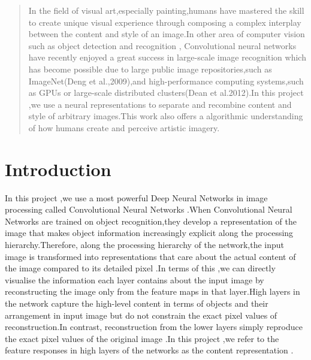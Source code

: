 \documentclass[conference]{IEEEtran}
\begin{document}
\begin{abstract}

In the field of visual art,especially painting,humans have mastered the 
skill to create unique visual experience through composing a complex interplay
between the content and style of an image.In other area of computer vision such as object detection and recognition , Convolutional neural networks 
have recently enjoyed a great success in large-scale image recognition\cite{Krizhevsky2012ImageNet} which has become possible due to large public image repositories,such as ImageNet(Deng et al.,2009),and high-performance computing systems,such as GPUs
or large-scale distributed clusters\cite{Deng2012Large}(Dean et al.2012).In this project ,we use 
a neural representations to separate and recombine content and style of arbitrary images.This work also offers a algorithmic understanding of how
humans create and perceive artistic imagery.
\end{abstract}





%
\IEEEpeerreviewmaketitle



\section{Introduction}
In this project ,we use a most powerful Deep Neural Networks in image processing called Convolutional Neural 
Networks .When Convolutional Neural Networks are trained on object recognition,they develop a representation of the image that makes object
information increasingly explicit along the processing hierarchy.Therefore,
along the processing hierarchy of the network,the input image is transformed
into representations that care about the actual content of the image compared
to its detailed pixel .In terms of this ,we can directly visualise the information each layer contains about the input image by reconstructing the image 
only from the feature maps in that layer.High layers in the network capture the high-level content in terms of objects and their arrangement in input image but do not constrain the exact pixel values of reconstruction.In contrast, reconstruction from the lower layers simply reproduce the exact
pixel values of the original image .In this project ,we refer to the feature 
responses in high layers of the networks as the content representation\cite{DBLP:journals/corr/GatysEB15a} .
\end{document}
